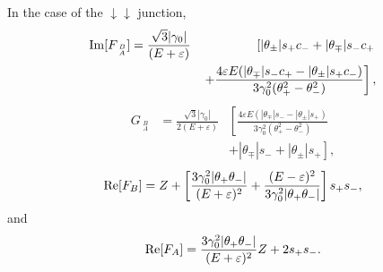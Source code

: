 \documentclass{jpsj3}
\begin{document}
In the case of the $\downarrow\downarrow$ junction,
\begin{eqnarray}
{\rm Im} [F_{\;_A^B}]
&=
\frac{\sqrt{3}|\gamma_0|}{(E+\varepsilon)}
&
\left[
|\theta_\pm|s_+c_-+|\theta_\mp|s_-c_+
\right.
\nonumber \\
&& \left.+\frac{4\varepsilon E(|\theta_\mp|s_-c_+-|\theta_\pm|s_+c_-)}
{
3\gamma_0^2(\theta_+^2-\theta_-^2)
}
\right
],
\end{eqnarray}
\begin{eqnarray}
G_{\;_A^B}
&=
\frac{\sqrt{3}|\gamma_0|
}{2(E+\varepsilon)}
&
\left[ 
\frac{
4\varepsilon E
(
|\theta_\mp|s_--|\theta_\pm|s_+
)
}
{
3\gamma_0^2(\theta_+^2-\theta_-^2)
}
\right.
\nonumber \\
&&
\left.
+|\theta_\mp|s_-+|\theta_\pm|s_+
\right],
\end{eqnarray}
\begin{equation}
{\rm Re} [F_B]
=Z +
\left[
\frac{3\gamma_0^2|\theta_+\theta_-|}{(E+\varepsilon)^2}
+
\frac{(E-\varepsilon)^2}{3\gamma_0^2|\theta_+\theta_-|}
\right]s_+s_-,
\end{equation}
and
\begin{equation}
{\rm Re} [F_A]
=\frac{3\gamma_0^2|\theta_+\theta_-|}{(E+\varepsilon)^2}Z
+2s_+s_-.
\end{equation}
\end{document}
